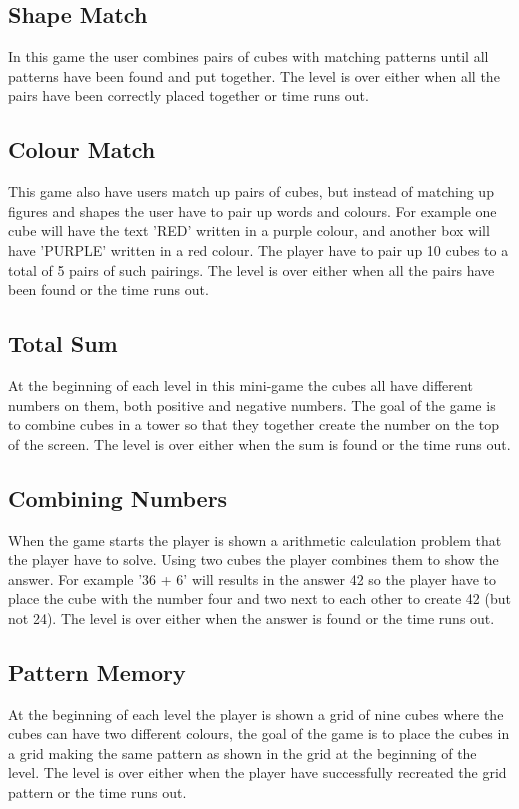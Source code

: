 \subsection{Shape Match}
\label{game:shape_match} 
In this game the user combines pairs of cubes with matching patterns until all patterns have been found and put together.
The level is over either when all the pairs have been correctly placed together or time runs out.

\subsection{Colour Match}
\label{game:colour_match}
This game also have users match up pairs of cubes, but instead of matching up figures and shapes the user have to pair up words and colours. For example one cube will have the text 'RED' written in a purple colour, and another box will have 'PURPLE' written in a red colour. The player have to pair up 10 cubes to a total of 5 pairs of such pairings.
The level is over either when all the pairs have been found or the time runs out.

\subsection{Total Sum}
\label{game:total_sum}
At the beginning of each level in this mini-game the cubes all have different numbers on them, both positive and negative numbers. The goal of the game is to combine cubes in a tower so that they together create the number on the top of the screen.
The level is over either when the sum is found or the time runs out.

\subsection{Combining Numbers}
\label{game:combining_numbers}
When the game starts the player is shown a arithmetic calculation problem that the player have to solve. Using two cubes the player combines them to show the answer. For example '36 + 6' will results in the answer 42 so the player have to place the cube with the number four and two next to each other to create 42 (but not 24).
The level is over either when the answer is found or the time runs out.

\subsection{Pattern Memory}
\label{game:pattern_memory}
At the beginning of each level the player is shown a grid of nine cubes where the cubes can have two different colours, the goal of the game is to place the cubes in a grid making the same pattern as shown in the grid at the beginning of the level. The level is over either when the player have successfully recreated the grid pattern or the time runs out.

